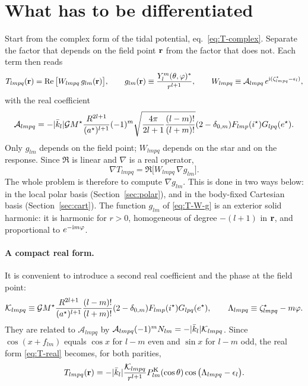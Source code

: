 \section{What has to be differentiated}
Start from the complex form of the tidal potential, eq.~\eqref{eq:T-complex}. Separate the factor that depends on the field point $\mathbf r$ from the factor that does not. Each term then reads
\begin{equation}
  T_{lmpq}(\mathbf r)=\operatorname{Re}\big[W_{lmpq}\,g_{lm}(\mathbf r)\big],\qquad g_{lm}(\mathbf r)\equiv\frac{Y_l^m(\theta,\varphi)^*}{r^{l+1}},\qquad W_{lmpq}\equiv\mathcal A_{lmpq}\,e^{\mathrm{i}(\zeta^\star_{lmpq}-\epsilon_l)}, \label{eq:T-W-g}
\end{equation}
with the real coefficient
\begin{equation}
  \mathcal A_{lmpq}=-|\bar k_l|\mathcal{G} M^\star\frac{R^{2l+1}}{(a^\star)^{l+1}}(-1)^m\sqrt{\frac{4\pi}{2l+1}\frac{(l-m)!}{(l+m)!}}(2-\delta_{0,m})F_{lmp}(i^\star)G_{lpq}(e^\star). \label{eq:Almpq}
\end{equation}
Only $g_{lm}$ depends on the field point; $W_{lmpq}$ depends on the star and on the response. Since $\Re$ is linear and $\nabla$ is a real operator,
\begin{equation}
  \nabla T_{lmpq}=\Re\big[W_{lmpq}\,\nabla g_{lm}\big]. \label{eq:gradT-g}
\end{equation}
The whole problem is therefore to compute $\nabla g_{lm}$. This is done in two ways below: in the local polar basis (Section~\ref{sec:polar}), and in the body-fixed Cartesian basis (Section~\ref{sec:cart}). The function $g_{lm}$ of \eqref{eq:T-W-g} is an exterior solid harmonic: it is harmonic for $r>0$, homogeneous of degree $-(l+1)$ in $\mathbf r$, and proportional to $e^{-\mathrm{i} m\varphi}$.

\paragraph{A compact real form.} It is convenient to introduce a second real coefficient and the phase at the field point:
\begin{equation}
  \mathcal K_{lmpq}\equiv\mathcal{G} M^\star\frac{R^{2l+1}}{(a^\star)^{l+1}}\frac{(l-m)!}{(l+m)!}(2-\delta_{0,m})F_{lmp}(i^\star)G_{lpq}(e^\star),\qquad
  \Lambda_{lmpq}\equiv\zeta^\star_{lmpq}-m\varphi. \label{eq:Klmpq}
\end{equation}
They are related to $\mathcal A_{lmpq}$ by $\mathcal A_{lmpq}(-1)^mN_{lm}=-|\bar k_l|\mathcal K_{lmpq}$. Since $\cos(x+f_{lm})$ equals $\cos x$ for $l-m$ even and $\sin x$ for $l-m$ odd, the real form \eqref{eq:T-real} becomes, for both parities,
\begin{equation}
  T_{lmpq}(\mathbf r)=-|\bar k_l|\frac{\mathcal K_{lmpq}}{r^{l+1}}P^{\mathrm K}_{lm}(\cos\theta)\cos\big(\Lambda_{lmpq}-\epsilon_l\big). \label{eq:T-compact}
\end{equation}

